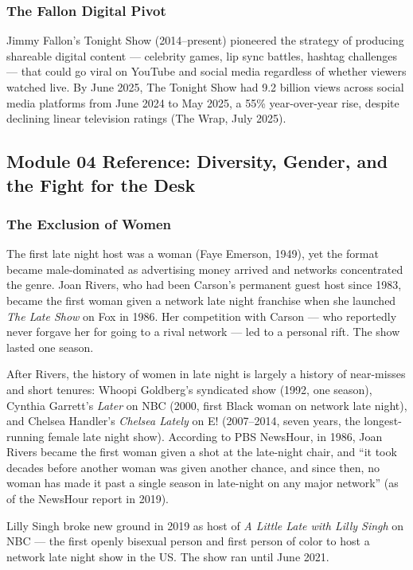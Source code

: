 \documentclass[11pt,letterpaper]{article}
\begin{document}
\subsubsection{The Fallon Digital Pivot}
Jimmy Fallon's Tonight Show (2014--present) pioneered the strategy of producing shareable digital content --- celebrity games, lip sync battles, hashtag challenges --- that could go viral on YouTube and social media regardless of whether viewers watched live. By June 2025, The Tonight Show had 9.2 billion views across social media platforms from June 2024 to May 2025, a 55\% year-over-year rise, despite declining linear television ratings (The Wrap, July 2025).

\subsection{Module 04 Reference: Diversity, Gender, and the Fight for the Desk}

\subsubsection{The Exclusion of Women}
The first late night host was a woman (Faye Emerson, 1949), yet the format became male-dominated as advertising money arrived and networks concentrated the genre. Joan Rivers, who had been Carson's permanent guest host since 1983, became the first woman given a network late night franchise when she launched \textit{The Late Show} on Fox in 1986. Her competition with Carson --- who reportedly never forgave her for going to a rival network --- led to a personal rift. The show lasted one season.

After Rivers, the history of women in late night is largely a history of near-misses and short tenures: Whoopi Goldberg's syndicated show (1992, one season), Cynthia Garrett's \textit{Later} on NBC (2000, first Black woman on network late night), and Chelsea Handler's \textit{Chelsea Lately} on E! (2007--2014, seven years, the longest-running female late night show). According to PBS NewsHour, in 1986, Joan Rivers became the first woman given a shot at the late-night chair, and ``it took decades before another woman was given another chance, and since then, no woman has made it past a single season in late-night on any major network'' (as of the NewsHour report in 2019).

Lilly Singh broke new ground in 2019 as host of \textit{A Little Late with Lilly Singh} on NBC --- the first openly bisexual person and first person of color to host a network late night show in the US. The show ran until June 2021.
\end{document}
